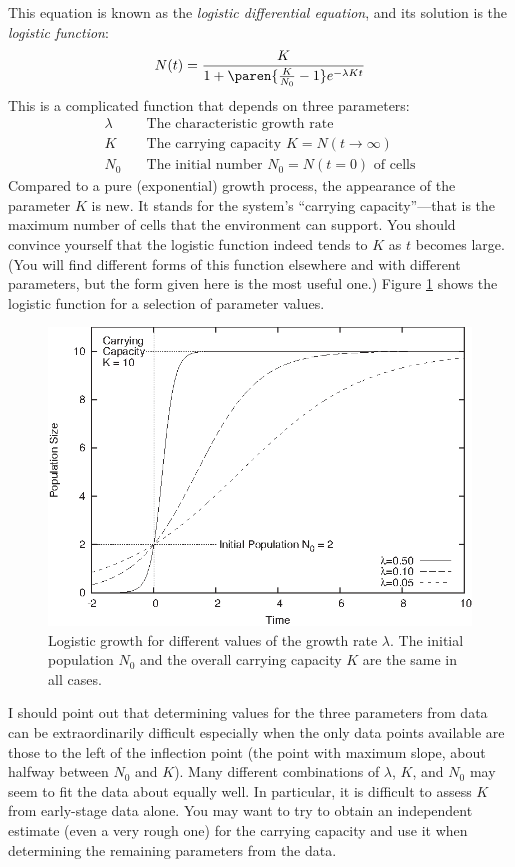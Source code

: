 This equation is known as the \emph{logistic differential equation},
and its solution is the \emph{logistic function}:
%
\[
N(t) = \frac{K}{1 + \paren{ \frac{K}{N_0} -1 } e^{-\lambda K t} }
\]
%
This is a complicated function that depends on three parameters:
\begin{align*}
\lambda & \quad \text{The characteristic growth rate} \\
K       & \quad \text{The carrying capacity $K=N(t \to \infty)$} \\
N_0     & \quad \text{The initial number $N_0=N(t=0)$ of cells} 
\end{align*}
Compared to a pure (exponential) growth process, the appearance of the
parameter $K$ is new. It stands for the system's ``carrying
capacity''---that is the maximum number of cells that the environment
can support.  You should convince yourself that the logistic function
indeed tends to $K$ as $t$ becomes large. (You will find different
forms of this function elsewhere and with different parameters,
but the form given here is the most useful one.) Figure
\ref{fig:logisticscaling} shows the logistic function for a selection
of parameter values.

\begin{figure}
\centerline{\includegraphics{img/logisticscaling}}
  \caption{Logistic growth for different values of the growth rate 
    $\lambda$. The initial population $N_0$ and the overall carrying
    capacity $K$ are the same in all cases.}
  \label{fig:logisticscaling}
\end{figure}

I should point out that determining values for the three parameters
from data can be extraordinarily difficult especially when the only
data points available are those to the left of the inflection point
(the point with maximum slope, about halfway between $N_0$ and $K$).
Many different combinations of $\lambda$, $K$, and $N_0$ may seem to
fit the data about equally well. In particular, it is difficult to
assess $K$ from early-stage data alone. You may want to try to obtain
an independent estimate (even a very rough one) for the carrying
capacity and use it when determining the remaining parameters from the
data.

